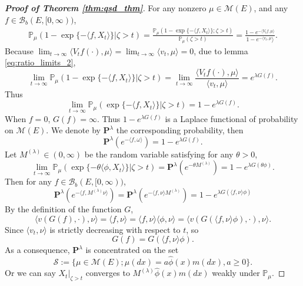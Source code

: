 \documentclass[12pt,a4paper]{amsart}
\numberwithin{equation}{section}
\theoremstyle{plain}
\theoremstyle{definition}
\begin{document}
\begin{proof}[{\bf Proof of Theorem \ref{thm:qsd_thm}}]
  For any nonzero $\mu\in \mathcal M(E)$, and any $f\in\mathcal B_b(E,[0,\infty))$,
  \begin{eqnarray*}
    \mathbb P_\mu\left(\left.1-\exp\{-\langle f, X_t\rangle \}\right|\zeta>t\right)= \frac{\mathbb P_\mu\left(1-\exp\{-\langle f, X_t\rangle \};\zeta>t\right)}{\mathbb P_\mu(\zeta>t)}=\frac{1-e^{-\langle V_tf,\mu\rangle }}{1-e^{-\langle v_t,\mu}\rangle }.
  \end{eqnarray*}
  Because $\lim_{t\rightarrow\infty}\langle V_tf(\cdot),\mu\rangle =\lim_{t\rightarrow\infty}\langle v_t,\mu\rangle =0$, due to lemma \ref{eq:ratio_limits_2},
  \[
    \lim_{t\rightarrow\infty}\mathbb P_\mu\left(\left.1-\exp\{-\langle f, X_t\rangle \}\right|\zeta>t\right)=\lim_{t\rightarrow\infty}\frac{\langle V_tf(\cdot),\mu\rangle }{\langle v_t,\mu\rangle }=e^{\lambda G(f)}.
  \]
  Thus
  \[
    \lim_{t\rightarrow\infty}\mathbb P_\mu\left(\left.\exp\{-\langle f, X_t\rangle \}\right|\zeta>t\right)=1-e^{\lambda G(f)}.
  \]
  When $f=0$, $G(f)=\infty$. Thus $1-e^{\lambda G(f)}$ is a Laplace functional of probability on $\mathcal M(E)$. We denote by $\mathbf P^{\lambda}$ the corresponding probability, then
  \[
    \mathbf P^{\lambda}(e^{-\langle f,\omega\rangle })=1-e^{\lambda G(f)}.
  \]
  Let $M^{(\lambda)}\in (0,\infty)$ be the random variable satisfying for any $\theta>0$,
  \[
    \lim_{t\rightarrow\infty}\mathbb P_\mu\left(\left.\exp\{-\theta\langle \phi, X_t\rangle \}\right|\zeta>t\right)
    =\mathbf P^{\lambda}(e^{-\theta M^{(\lambda)}})=1-e^{\lambda G(\theta\phi)}.
  \]
  Then for any $f\in \mathcal B_b(E,[0,\infty))$,
  \[
    \mathbf P^{\lambda}(e^{-\langle f,M^{(\lambda)}\nu\rangle })
    =\mathbf P^{\lambda}(e^{-\langle f,\nu\rangle M^{(\lambda)}})
    =1-e^{\lambda G(\langle f,\nu\rangle \phi)}
  \]
  By the definition of the function $G$,
  \[
    \langle v(G(f),\cdot),\nu\rangle =\langle f,\nu\rangle =\langle f,\nu\rangle \langle \phi,\nu\rangle =\langle v(G(\langle f,\nu\rangle \phi),\cdot),\nu\rangle .
  \]
  Since $\langle v_t,\nu\rangle $ is strictly decreasing with respect to $t$, so
  \begin{equation}\label{eq:eq_iden_G}
    G(f)=G(\langle f,\nu\rangle \phi).
  \end{equation}
  As a consequence, $\mathbf P^\lambda$ is concentrated on the set
  $$
  \mathcal S:=\{\mu\in\mathcal M(E); \mu(dx)=a\widehat\phi(x)m(dx), a\geq 0\}.
  $$
  Or we can say  $X_t|_{\zeta>t}$ converges to  $M^{(\lambda)}\widehat\phi(x)m(dx)$ weakly under $\mathbb P_\mu$.



\end{proof}
\end{document}

